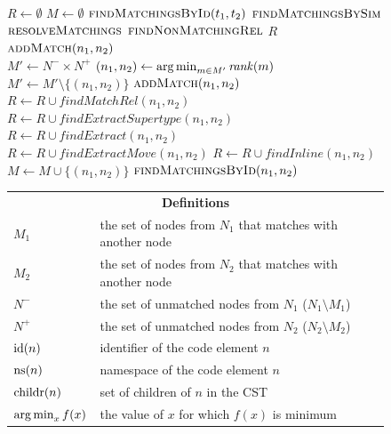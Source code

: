 \begin{figure}[htbp]
\small
\begin{algorithmic}[1]
\State $R \gets \emptyset$
\State $M \gets \emptyset$
\State $\textsc{findMatchingsById}(t_1,t_2)$
\State $\textsc{findMatchingsBySim}$
\State $\textsc{resolveMatchings}$
\State $\textsc{findNonMatchingRel}$
\State \Return $R$
\\
    \State $\textsc{addMatch}(n_1, n_2)$
  \EndIf
\EndFor
\EndProcedure
\\
\State $M' \gets N^- \times N^+$
  \State $(n_1, n_2) \gets \operatorname*{arg\,min}_{m \in M'} \operatorname{\mathit{rank}}(m)$
  \State $M' \gets M' \setminus \{(n_1, n_2)\}$
    \State $\textsc{addMatch}(n_1, n_2)$
  \EndIf
\EndWhile
\EndProcedure
\\
  \State $R \gets R \cup \mathit{findMatchRel}(n_1, n_2)$
\EndFor
\EndProcedure
\\
  \State $R \gets R \cup \mathit{findExtractSupertype}(n_1, n_2)$
  \State $R \gets R \cup \mathit{findExtract}(n_1, n_2)$
  \State $R \gets R \cup \mathit{findExtractMove}(n_1, n_2)$
\EndFor
{}
  \State $R \gets R \cup \mathit{findInline}(n_1, n_2)$
\EndFor
\EndProcedure
\\
  \State $M \gets M \cup \{(n_1, n_2)\}$
  \State $\textsc{findMatchingsById}(n_1,n_2)$
\EndIf
\EndProcedure
\\
\EndProcedure

\end{algorithmic}

\vspace{1em}
{
\footnotesize
\renewcommand{\arraystretch}{1.3}
\begin{tabular}{@{}ll@{}}
\midrule
\multicolumn{2}{c}{\textbf{Definitions}}\\
$M_1$ & the set of nodes from $N_1$ that matches with another node\\
$M_2$ & the set of nodes from $N_2$ that matches with another node\\
$N^-$ & the set of unmatched nodes from $N_1$ ($N_1 \setminus M_1$)\\
$N^+$ & the set of unmatched nodes from $N_2$ ($N_2 \setminus M_2$)\\
$\operatorname{id}(n)$ & identifier of the code element $n$\\
$\operatorname{ns}(n)$ & namespace of the code element $n$\\
$\operatorname{childr}(n)$ & set of children of $n$ in the CST\\
$\operatorname*{arg\,min}_{x} f(x)$ & the value of $x$ for which $f(x)$ is minimum\\
\midrule
\end{tabular}
}


\end{figure}
